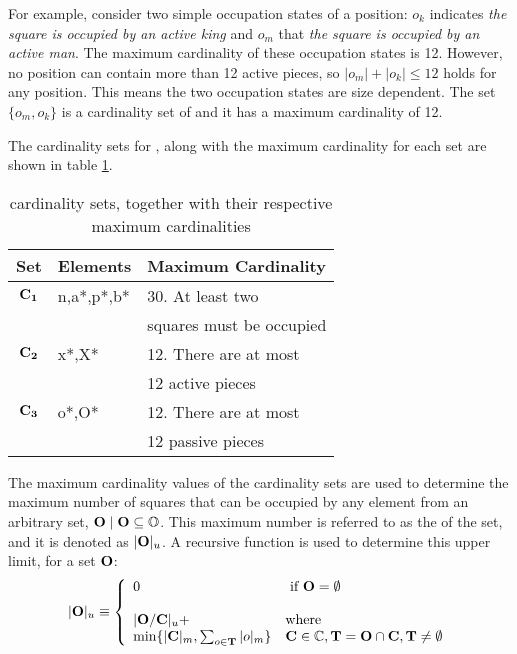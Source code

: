 For example, consider two simple occupation states of a  position: $o_k$ indicates  {\sl the square is occupied by an active king} and $o_m$ that {\sl the square is occupied by an active man}. The maximum cardinality of these occupation states is 12. However, no position can contain more than 12 active pieces, so $|o_m| + |o_k| \leq 12$ holds for any  position. This means the two occupation states are size dependent.  The set $\{o_m,o_k\}$ is a cardinality set of  and it has a maximum cardinality of 12.

The cardinality sets for , along with the maximum cardinality for each set are shown in table \ref{tab:csets}.
\begin{table} [!ht]
\caption { cardinality sets, together with their respective maximum cardinalities}
\center
\small
\begin{tabular}[hbt]{|c|l|l|} 
\hline
Set & Elements & Maximum Cardinality \\
\hline
${\bf C_1}$ & n,a*,p*,b* & 30.  At least two \\
&& squares must be occupied \\
\hline	
${\bf C_2}$ & x*,X* & 12.  There are at most \\
&&12 active pieces \\
\hline	
${\bf C_3}$ & o*,O* & 12.  There are at most \\
&&12 passive pieces \\
\hline	
\end{tabular}
\label{tab:csets}
\end{table}
The maximum cardinality values of the cardinality sets are used to determine the maximum number of squares that can be occupied by any element from an arbitrary set, ${\bf O} \; | \; {\bf O} \subseteq \mathbb{O}$.   This maximum number is referred to as the  of the set, and it is denoted as $|{\bf O}|_u$.  A recursive function is used to determine this upper limit, for a set ${\bf O}$:
\[
|{\bf O}|_u  \equiv \left\{
\begin{array}{ll}
0 & \mbox{ if } {\bf O} = \emptyset \\
&\\
     |{\bf O} / {\bf C}|_u +  &  \mbox {where } \\ 
\mbox{min} \{|{\bf C}|_m, \sum_{o \in {\bf T}} |o|_m \} 
												
												&{\bf C} \in \mathbb{C}, 
												{\bf T} = {\bf O} \cap {\bf C},                    
                 								{\bf T} \neq \emptyset  \\
\end{array}
\right.
\]
